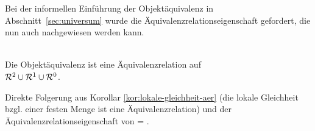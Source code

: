     Bei der informellen Einführung der Objektäquivalenz in Abschnitt~\ref{sec:universum} wurde die Äquivalenzrelationseigenschaft gefordert, die nun auch nachgewiesen werden kann.
    
    \begin{satz}\ \\
        Die Objektäquivalenz ist eine Äquivalenzrelation auf\\
        $\mathcal{R}^2 \cup \mathcal{R}^1 \cup \mathcal{R}^0$.
    \end{satz}
    
    \begin{bew}
		Direkte Folgerung aus Korollar \ref{kor:lokale-gleichheit-aer} (die lokale Gleichheit bzgl. einer festen Menge ist eine Äquivalenzrelation) und der Äquivalenzrelationseigenschaft von \glqq = \grqq .
    \end{bew}
 
    
    
    
    
